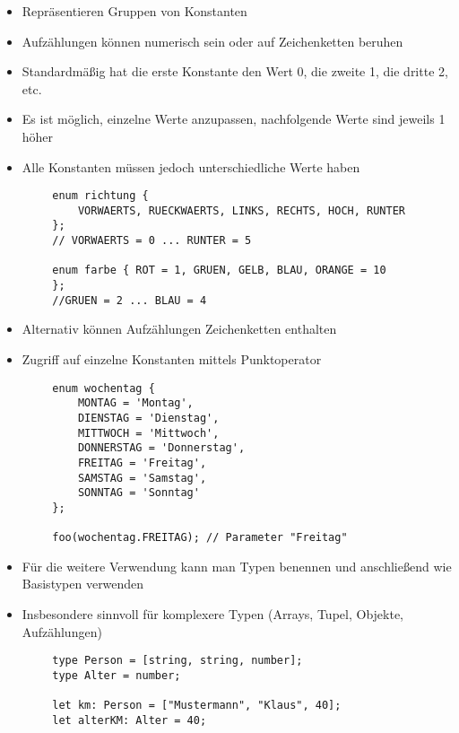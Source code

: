 \documentclass[10pt]{article}
\begin{document}
    \begin{tcolorbox}[
    colback=Purple!5!white,
    colframe=Purple!75!black,
    title={\centering Aufzählungen}]
    \begin{itemize}
        \item Repräsentieren Gruppen von Konstanten
        \item Aufzählungen können numerisch sein oder auf Zeichenketten beruhen
        \item Standardmäßig hat die erste Konstante den Wert 0, die zweite 1, die dritte 2, etc.
        \item Es ist möglich, einzelne Werte anzupassen, nachfolgende Werte sind jeweils 1 höher
        \item Alle Konstanten müssen jedoch unterschiedliche Werte haben
    \end{itemize}
    \begin{lstlisting}
        enum richtung {
            VORWAERTS, RUECKWAERTS, LINKS, RECHTS, HOCH, RUNTER
        };
        // VORWAERTS = 0 ... RUNTER = 5

        enum farbe { ROT = 1, GRUEN, GELB, BLAU, ORANGE = 10
        };
        //GRUEN = 2 ... BLAU = 4
    \end{lstlisting}
    \begin{itemize}
        \item Alternativ können Aufzählungen Zeichenketten enthalten
        \item Zugriff auf einzelne Konstanten mittels Punktoperator
    \end{itemize}
    \begin{lstlisting}
        enum wochentag {
            MONTAG = 'Montag',
            DIENSTAG = 'Dienstag',
            MITTWOCH = 'Mittwoch',
            DONNERSTAG = 'Donnerstag',
            FREITAG = 'Freitag',
            SAMSTAG = 'Samstag',
            SONNTAG = 'Sonntag'
        };

        foo(wochentag.FREITAG); // Parameter "Freitag"
    \end{lstlisting}
    \end{tcolorbox}

    \begin{tcolorbox}[
    colback=Blue!5!white,
    colframe=Blue!75!black,
    title={\centering Typen Aliase}]
    \begin{itemize}
        \item Für die weitere Verwendung kann man Typen benennen und anschließend wie Basistypen verwenden
        \item Insbesondere sinnvoll für komplexere Typen (Arrays, Tupel, Objekte, Aufzählungen)
    \end{itemize}
    \begin{lstlisting}
        type Person = [string, string, number];
        type Alter = number;

        let km: Person = ["Mustermann", "Klaus", 40];
        let alterKM: Alter = 40;
    \end{lstlisting}
    \end{tcolorbox}
\end{document}
